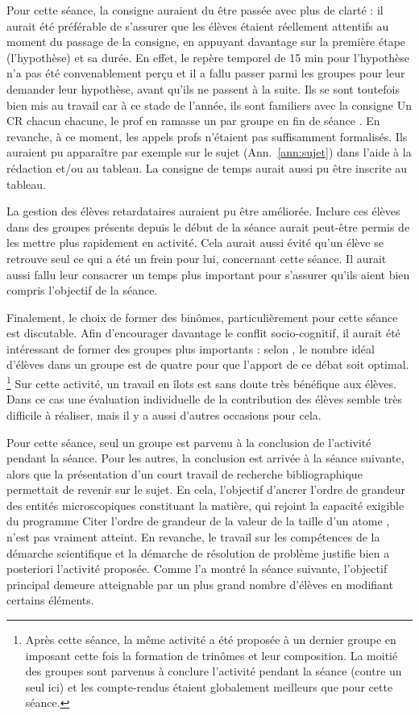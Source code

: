 \documentclass[12pt,a4paper, fleqn]{report}
\begin{document}
Pour cette séance, la consigne auraient du être passée avec plus de clarté : il aurait été préférable de s'assurer que les élèves étaient réellement attentifs au moment du passage de la consigne, en appuyant davantage sur la première étape (l'hypothèse) et sa durée.
En effet, le repère temporel de 15 min pour l'hypothèse n'a pas été convenablement perçu et il a fallu passer parmi les groupes pour leur demander leur hypothèse, avant qu'ils ne passent à la suite.
Ils se sont toutefois bien mis au travail car à ce stade de l'année, ils sont familiers avec la consigne \og Un CR chacun chacune, le prof en ramasse un par groupe en fin de séance \fg{}.
En revanche, à ce moment, les appels profs n'étaient pas suffisamment formalisés.
Ils auraient pu apparaître par exemple sur le sujet (Ann.~\ref{ann:sujet}) dans l'aide à la rédaction et/ou au tableau.
La consigne de temps aurait aussi pu être inscrite au tableau.

La gestion des élèves retardataires auraient pu être améliorée.
Inclure ces élèves dans des groupes présents depuis le début de la séance aurait peut-être permis de les mettre plus rapidement en activité.
Cela aurait aussi évité qu'un élève se retrouve seul ce qui a été un frein pour lui, concernant cette séance.
Il aurait aussi fallu leur consacrer un temps plus important pour s'assurer qu'ils aient bien compris l'objectif de la séance.

Finalement, le choix de former des binômes, particulièrement pour cette séance est discutable.
Afin d'encourager davantage le conflit socio-cognitif, il aurait été intéressant de former des groupes plus importants : selon \cite{Courtillot2006}, le nombre idéal d'élèves dans un groupe est de quatre pour que l'apport de ce débat soit optimal.
\footnote{Après cette séance, la même activité a été proposée à un dernier groupe en imposant cette fois la formation de trinômes et leur composition.
La moitié des groupes sont parvenus à conclure l'activité pendant la séance (contre un seul ici) et les compte-rendus étaient globalement meilleurs que pour cette séance.}
Sur cette activité, un travail en îlots est sans doute très bénéfique aux élèves.
Dans ce cas une évaluation individuelle de la contribution des élèves semble très difficile à réaliser, mais il y a aussi d'autres occasions pour cela.

Pour cette séance, seul un groupe est parvenu à la conclusion de l'activité pendant la séance.
Pour les autres, la conclusion est arrivée à la séance suivante, alors que la présentation d'un court travail de recherche bibliographique permettait de revenir sur le sujet.
En cela, l'objectif d'ancrer l'ordre de grandeur des entités microscopiques constituant la matière, qui rejoint la capacité exigible du programme \og Citer l'ordre de grandeur de la valeur de la taille d'un atome \fg{}, n'est pas vraiment atteint.
En revanche, le travail sur les compétences de la démarche scientifique et la démarche de résolution de problème justifie bien a posteriori l'activité proposée.
Comme l'a montré la séance suivante, l'objectif principal demeure atteignable par un plus grand nombre d'élèves en modifiant certains éléments.
\end{document}
